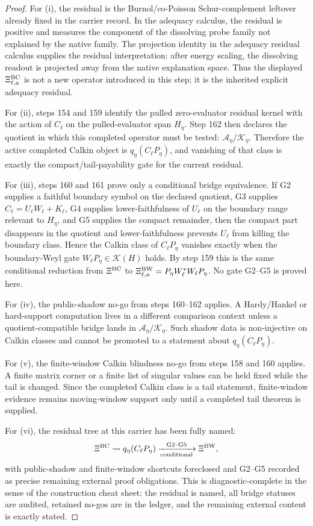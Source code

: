 \documentclass[11pt]{article}
\begin{document}
\begin{proof}
For (i), the residual is the Burnol/co-Poisson Schur-complement leftover
already fixed in the carrier record.  In the adequacy calculus, the residual is
positive and measures the component of the dissolving probe family not explained
by the native family.  The projection identity in the adequacy residual
calculus supplies the residual interpretation: after energy scaling, the
dissolving readout is projected away from the native explanation space.  Thus
the displayed \(\Xi^{\rm BC}_{\ell,a}\) is not a new operator introduced in this
step; it is the inherited explicit adequacy residual.

For (ii), steps 154 and 159 identify the pulled zero-evaluator residual kernel
with the action of \(C_\ell\) on the pulled-evaluator span \(H_\eta\).  Step 162
then declares the quotient in which this completed operator must be tested:
\(\mathcal A_\eta/\mathcal K_\eta\).  Therefore the active completed Calkin
object is \(q_\eta(C_\ell P_\eta)\), and vanishing of that class is exactly the
compact/tail-payability gate for the current residual.

For (iii), steps 160 and 161 prove only a conditional bridge equivalence.  If
G2 supplies a faithful boundary symbol on the declared quotient, G3 supplies
\(C_\ell=U_\ell W_\ell+K_\ell\), G4 supplies lower-faithfulness of \(U_\ell\) on
the boundary range relevant to \(H_\eta\), and G5 supplies the compact
remainder, then the compact part disappears in the quotient and
lower-faithfulness prevents \(U_\ell\) from killing the boundary class.  Hence
the Calkin class of \(C_\ell P_\eta\) vanishes exactly when the boundary-Weyl
gate \(W_\ell P_\eta\in\mathcal K(H)\) holds.  By step 159 this is the same
conditional reduction from \(\Xi^{\rm BC}\) to
\(\Xi^{\rm BW}_{\ell,a}=P_\eta W_\ell^*W_\ell P_\eta\).  No gate G2--G5 is
proved here.

For (iv), the public-shadow no-go from steps 160--162 applies.  A Hardy/Hankel
or hard-support computation lives in a different comparison context unless a
quotient-compatible bridge lands in \(\mathcal A_\eta/\mathcal K_\eta\).  Such
shadow data is non-injective on Calkin classes and cannot be promoted to a
statement about \(q_\eta(C_\ell P_\eta)\).

For (v), the finite-window Calkin blindness no-go from steps 158 and 160
applies.  A finite matrix corner or a finite list of singular values can be
held fixed while the tail is changed.  Since the completed Calkin class is a
tail statement, finite-window evidence remains moving-window support only until
a completed tail theorem is supplied.

For (vi), the residual tree at this carrier has been fully named:
\[
  \Xi^{\rm BC}
  \leadsto
  q_\eta(C_\ell P_\eta)
  \xrightarrow[\text{conditional}]{\text{G2--G5}}
  \Xi^{\rm BW},
\]
with public-shadow and finite-window shortcuts foreclosed and G2--G5 recorded
as precise remaining external proof obligations.  This is diagnostic-complete
in the sense of the construction cheat sheet: the residual is named, all bridge
statuses are audited, retained no-gos are in the ledger, and the remaining
external content is exactly stated.
\end{proof}
\end{document}
